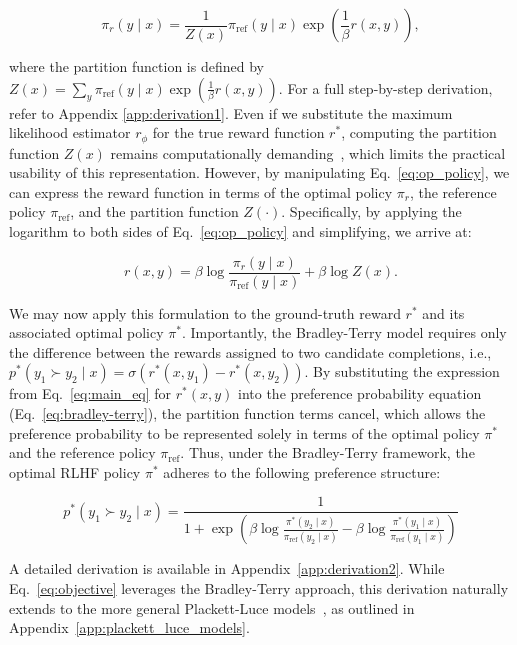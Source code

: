 \begin{equation}\label{eq:op_policy}
    \pi_r(y\mid x) = \frac{1}{Z(x)}\pi_\text{ref}(y\mid x)\exp\left(\frac{1}{\beta}r(x, y)\right),
\end{equation}

where the partition function is defined by $Z(x) =\sum_{y}\pi_\text{ref}(y\mid x)\exp\left(\frac{1}{\beta}r(x, y)\right)$. For a full step-by-step derivation, refer to Appendix \ref{app:derivation1}. Even if we substitute the maximum likelihood estimator $r_{\phi}$ for the true reward function $r^*$, computing the partition function $Z(x)$ remains computationally demanding~\citep{korbak2022reinforcement, go2023aligning}, which limits the practical usability of this representation. However, by manipulating Eq.~\ref{eq:op_policy}, we can express the reward function in terms of the optimal policy $\pi_r$, the reference policy $\pi_\text{ref}$, and the partition function $Z(\cdot)$. Specifically, by applying the logarithm to both sides of Eq.~\ref{eq:op_policy} and simplifying, we arrive at:

\begin{equation}\label{eq:main_eq}
    r(x,y) =\beta \log \frac{\pi_r(y\mid x)}{\pi_\text{ref}(y\mid x)} + \beta \log Z(x).
\end{equation}

We may now apply this formulation to the ground-truth reward $r^*$ and its associated optimal policy $\pi^*$. Importantly, the Bradley-Terry model requires only the difference between the rewards assigned to two candidate completions, i.e., ${p^*(y_1 \succ y_2 \mid x) = \sigma(r^*(x, y_1) - r^*(x, y_2))}$. By substituting the expression from Eq.~\ref{eq:main_eq} for $r^*(x,y)$ into the preference probability equation (Eq.~\ref{eq:bradley-terry}), the partition function terms cancel, which allows the preference probability to be represented solely in terms of the optimal policy $\pi^*$ and the reference policy $\pi_\text{ref}$. Thus, under the Bradley-Terry framework, the optimal RLHF policy $\pi^*$ adheres to the following preference structure:

\begin{equation}\label{eq:objective}
    p^*(y_1\succ y_2 \mid x)=\frac{1}{1 + \exp\left(\beta \log \frac{\pi^*(y_2\mid x)}{\pi_\text{ref}(y_2\mid x)} - \beta \log \frac{\pi^*(y_1\mid x)}{\pi_\text{ref}(y_1\mid x)}\right)}
\end{equation}

A detailed derivation is available in Appendix~\ref{app:derivation2}. While Eq.~\ref{eq:objective} leverages the Bradley-Terry approach, this derivation naturally extends to the more general Plackett-Luce models~\citep{plackett1975analysis, luce2012individual}, as outlined in Appendix~\ref{app:plackett_luce_models}.

